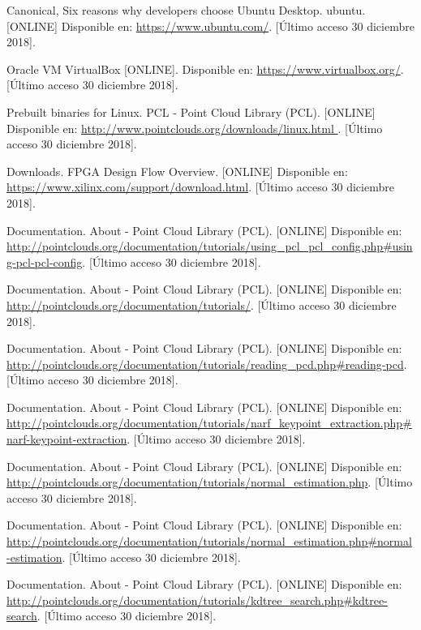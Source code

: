\begin{thebibliography}{99}
 Canonical, Six reasons why developers choose Ubuntu Desktop. ubuntu. [ONLINE] Disponible en: \url{https://www.ubuntu.com/}. [Último acceso 30 diciembre 2018].

 Oracle VM VirtualBox [ONLINE]. Disponible en: \url{https://www.virtualbox.org/}. [Último acceso 30 diciembre 2018].

 Prebuilt binaries for Linux. PCL - Point Cloud Library (PCL). [ONLINE] Disponible en: \url{http://www.pointclouds.org/downloads/linux.html }. [Último acceso 30 diciembre 2018].

 Downloads. FPGA Design Flow Overview.  [ONLINE] Disponible en: \url{https://www.xilinx.com/support/download.html}. [Último acceso 30 diciembre 2018].





 Documentation. About - Point Cloud Library (PCL). [ONLINE] Disponible en: \url{http://pointclouds.org/documentation/tutorials/using_pcl_pcl_config.php#using-pcl-pcl-config}. [Último acceso 30 diciembre 2018].


 Documentation. About - Point Cloud Library (PCL). [ONLINE] Disponible en: \url{http://pointclouds.org/documentation/tutorials/}. [Último acceso 30 diciembre 2018].

 Documentation. About - Point Cloud Library (PCL). [ONLINE] Disponible en: \url{http://pointclouds.org/documentation/tutorials/reading_pcd.php#reading-pcd}. [Último acceso 30 diciembre 2018].

 Documentation. About - Point Cloud Library (PCL). [ONLINE] Disponible en: \url{http://pointclouds.org/documentation/tutorials/narf_keypoint_extraction.php#narf-keypoint-extraction}. [Último acceso 30 diciembre 2018].


 Documentation. About - Point Cloud Library (PCL). [ONLINE] Disponible en: \url{http://pointclouds.org/documentation/tutorials/normal_estimation.php}. [Último acceso 30 diciembre 2018].


 Documentation. About - Point Cloud Library (PCL). [ONLINE] Disponible en: \url{
http://pointclouds.org/documentation/tutorials/normal_estimation.php#normal-estimation}. [Último acceso 30 diciembre 2018].


 Documentation. About - Point Cloud Library (PCL). [ONLINE] Disponible en: \url{http://pointclouds.org/documentation/tutorials/kdtree_search.php#kdtree-search}. [Último acceso 30 diciembre 2018].



\end{thebibliography}
